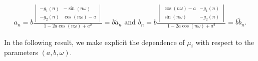 \documentclass[12pt]{article}
\theoremstyle{plain}
\theoremstyle{remark}
\theoremstyle{definition}
\begin{document}
\begin{align*}
    a_n = b\frac{
    \begin{vmatrix}
            -g_1(n) & -\sin(n\omega)\\
            -g_2(n) & \cos(n\omega)-a
        \end{vmatrix}
    }{1-2a\cos(n\omega)+a^2} = b\tilde{a}_n
    \text{ and }
    b_n = b\frac{
    \begin{vmatrix}
        \cos(n\omega)-a & -g_1(n)\\
        \sin(n\omega) & -g_2(n)
    \end{vmatrix}
    }{1-2a\cos(n\omega)+a^2} = b \tilde{b}_n.
\end{align*}

In the following result, we make explicit the dependence of $\mu_i$ with respect to the parameters $(a,b,\omega)$.
\end{document}
